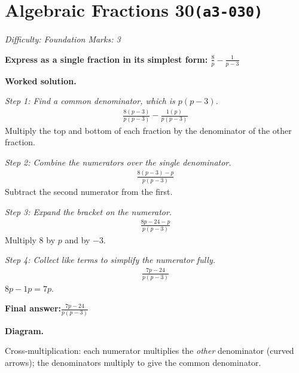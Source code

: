 \documentclass[11pt]{article}
\newcommand{\question}[1]{\par\medskip\noindent\textbf{#1}\par}
\begin{document}
\section*{Algebraic Fractions 30\quad\small\texttt{(a3-030)}}
\textit{Difficulty: Foundation \quad\textbar\quad Marks: 3}

\question{Express as a single fraction in its simplest form: \( \frac{8}{p} - \frac{1}{p-3} \)}

\textbf{Worked solution.}

\textit{Step 1: Find a common denominator, which is \( p(p-3) \).}
\[\begin{gathered}
\frac{8(p-3)}{p(p-3)} - \frac{1(p)}{p(p-3)}
\end{gathered}\]
Multiply the top and bottom of each fraction by the denominator of the other fraction.

\textit{Step 2: Combine the numerators over the single denominator.}
\[\begin{gathered}
\frac{8(p-3) - p}{p(p-3)}
\end{gathered}\]
Subtract the second numerator from the first.

\textit{Step 3: Expand the bracket on the numerator.}
\[\begin{gathered}
\frac{8p - 24 - p}{p(p-3)}
\end{gathered}\]
Multiply 8 by \( p \) and by \( -3 \).

\textit{Step 4: Collect like terms to simplify the numerator fully.}
\[\begin{gathered}
\frac{7p - 24}{p(p-3)}
\end{gathered}\]
\( 8p - 1p = 7p \).

\begin{answerbox}
\textbf{Final answer:}\quad \(\displaystyle \frac{7p - 24}{p(p-3)}\)
\end{answerbox}
\textbf{Diagram.}

\begin{center}
\end{center}
\small Cross-multiplication: each numerator multiplies the \emph{other} denominator (curved arrows); the denominators multiply to give the common denominator.\normalsize
\end{document}
